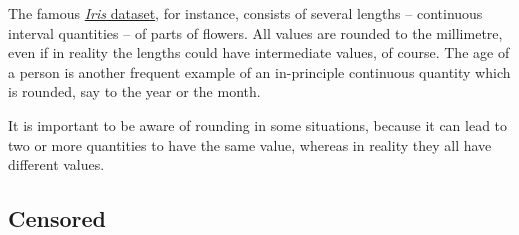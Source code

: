 \documentclass[
  a4paper,
  DIV=11,
  numbers=noendperiod,
  oneside]{scrreprt}
\begin{document}

The famous
\href{https://doi.org/10.1111/j.1469-1809.1936.tb02137.x}{\emph{Iris}
dataset}, for instance, consists of several lengths -- continuous
interval quantities -- of parts of flowers. All values are rounded to
the millimetre, even if in reality the lengths could have intermediate
values, of course. The age of a person is another frequent example of an
in-principle continuous quantity which is rounded, say to the year or
the month.

It is important to be aware of rounding in some situations, because it
can lead to two or more quantities to have the same value, whereas in
reality they all have different values.

\hypertarget{censored}{%
\subsection{Censored}\label{censored}}
\end{document}
